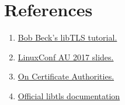 \documentclass[11pt]{article}
\begin{document}
\section{References}
\begin{enumerate}
\item \href{https://github.com/bob-beck/libtls/blob/master/TUTORIAL.md}{Bob Beck's libTLS tutorial.}
\item \href{http://www.openbsd.org/papers/linuxconfau2017-libtls/}{LinuxConf AU 2017 slides.}
\item \href{https://jamielinux.com/docs/openssl-certificate-authority/introduction.html}{On Certificate Authorities.}
\item \href{https://man.openbsd.org/tls_init.3}{Official libtls documentation}
\end{enumerate}
\end{document}
